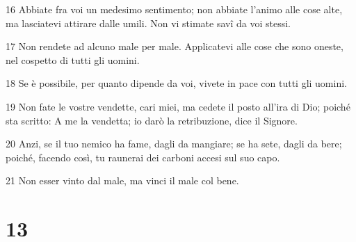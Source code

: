 \par 16 Abbiate fra voi un medesimo sentimento; non abbiate l'animo alle cose alte, ma lasciatevi attirare dalle umili. Non vi stimate savî da voi stessi.
\par 17 Non rendete ad alcuno male per male. Applicatevi alle cose che sono oneste, nel cospetto di tutti gli uomini.
\par 18 Se è possibile, per quanto dipende da voi, vivete in pace con tutti gli uomini.
\par 19 Non fate le vostre vendette, cari miei, ma cedete il posto all'ira di Dio; poiché sta scritto: A me la vendetta; io darò la retribuzione, dice il Signore.
\par 20 Anzi, se il tuo nemico ha fame, dagli da mangiare; se ha sete, dagli da bere; poiché, facendo così, tu raunerai dei carboni accesi sul suo capo.
\par 21 Non esser vinto dal male, ma vinci il male col bene.

\chapter{13}


